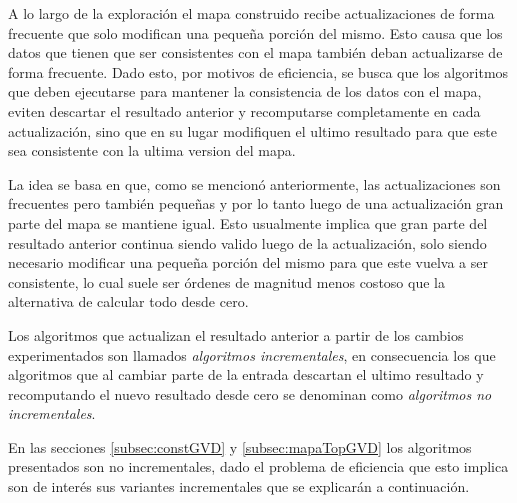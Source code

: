 A lo largo de la exploración el mapa construido recibe actualizaciones de forma frecuente que solo modifican una pequeña porción del mismo. Esto causa que los datos que tienen que ser consistentes con el mapa también deban actualizarse de forma frecuente. Dado esto, por motivos de eficiencia, se busca que los algoritmos que deben ejecutarse para mantener la consistencia de los datos con el mapa, eviten descartar el resultado anterior y recomputarse completamente en cada actualización, sino que en su lugar modifiquen el ultimo resultado para que este sea consistente con la ultima version del mapa. 

La idea se basa en que, como se mencionó anteriormente, las actualizaciones son frecuentes pero también pequeñas y por lo tanto luego de una actualización gran parte del mapa se mantiene igual. Esto usualmente implica que gran parte del resultado anterior continua siendo valido luego de la actualización, solo siendo necesario modificar una pequeña porción del mismo para que este vuelva a ser consistente, lo cual suele ser órdenes de magnitud menos costoso que la alternativa de calcular todo desde cero. 

Los algoritmos que actualizan el resultado anterior a partir de los cambios experimentados son llamados \emph{algoritmos incrementales}, en consecuencia los que algoritmos que al cambiar parte de la entrada descartan el ultimo resultado y recomputando el nuevo resultado desde cero se denominan como \emph{algoritmos no incrementales}.

En las secciones \ref{subsec:constGVD} y \ref{subsec:mapaTopGVD} los algoritmos presentados son no incrementales, dado el problema de eficiencia que esto implica son de interés sus variantes incrementales que se explicarán a continuación.

